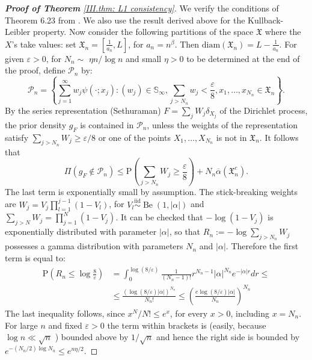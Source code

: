 \begin{proof}[\hypertarget{III.proof consistency in L1}{\textbf{Proof of Theorem} \ref{III.thm: L1 consistency}}]
We verify the conditions of Theorem 6.23 from \cite{4}. We also use the result derived above for the Kullback-Leibler property. 
Now consider the following partitions of the space $\mathfrak{X}$ where the $X$'s take values: set $\mathfrak{X}_n = [\frac{1}{a_n},L]$, for $a_n = n^{\beta}$. Then $\text{diam}(\mathfrak{X}_n) = L - \frac{1}{a_n}$.
For given $\varepsilon>0$, for $N_n \sim$ $\eta n / \log n$ and small $\eta >0$ to be determined at the end of the proof, define $\mathcal{P}_n$ by:
$$
\mathcal{P}_n=\left\{\sum_{j=1}^{\infty} w_j \psi\left(\cdot ; x_j\right):\left(w_j\right) \in \mathbb{S}_{\infty}, \sum_{j>N_n} w_j<\frac{\varepsilon}{8}, x_1,\ldots,x_{N_n} \in \mathfrak{X}_n \right\} .
$$
By the series representation (Sethuraman) $F =\sum_j W_j \delta_{X_j}$ of the Dirichlet process, the prior density $g_{\scriptscriptstyle{F}}$ is contained in $\mathcal{P}_n$, unless the weights of the representation satisfy $\sum_{j>N_n} W_j \geq \varepsilon / 8$ or one of the points $X_1, \ldots, X_{N_n}$ is not in $\mathfrak{X}_n $. It follows that
$$
\Pi \left(g_{\scriptscriptstyle{F}} \notin \mathcal{P}_n\right) \leq \mathrm{P} \left(\sum_{j>N_n} W_j \geq \frac{\varepsilon}{8}\right) + N_n \overline{\alpha}(\mathfrak{X}_n^{c}).
$$
The last term is exponentially small by assumption. The stick-breaking weights are $W_j=V_j \prod_{l=1}^{j-1}\left(1-V_l\right)$, for $V_l \stackrel{\mathrm{iid}}{\sim} \operatorname{Be}(1,|\alpha|)$ and $\sum_{j>N} W_j=\prod_{j=1}^N\left(1-V_j\right)$. It can be checked that $-\log \left(1-V_j\right)$ is exponentially distributed with parameter $|\alpha|$, so that $R_n:=-\log \sum_{j>N_n} W_j$ possesses a gamma distribution with parameters $N_n$ and $|\alpha|$. Therefore the first term is equal to:
\begin{align*}
\mathrm{P} \left(R_n\leq \log \frac{8}{\varepsilon}\right)&=\int_0^{\log (8 / \varepsilon)} \frac{1}{\left(N_n-1\right) !} r^{N_n-1}|\alpha|^{N_n} e^{-|\alpha| r} d r \leq \\
&\leq \frac{(\log (8 / \varepsilon)|\alpha|)^{N_n}}{N_{n} !} \leq\left(\frac{e \log (8 / \varepsilon)|\alpha|}{N_n}\right)^{N_n}
\end{align*}
The last inequality follows, since $x^N / N ! \leq e^x$, for every $x>0$, including $x=N_n$. For large $n$ and fixed $\varepsilon >0$ the term within brackets is (easily, because $\log n \ll \sqrt{n}$ ) bounded above by $1 / \sqrt{n}$ and hence the right side is bounded by $e^{-\left(N_n / 2\right) \log N_n} \leq e^{n \eta /2}$.


\end{proof}
